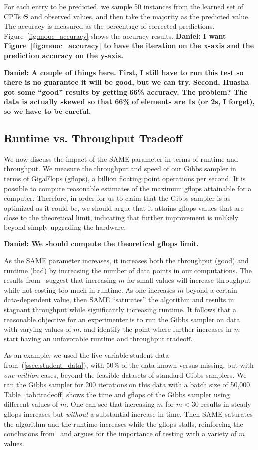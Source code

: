 \documentclass{article} %
\begin{document}
For each entry to be predicted, we sample 50 instances from the learned set of CPTs $\Theta$ and
observed values, and then take the majority as the predicted value. The accuracy is measured as the
percentage of corrected predictions.  Figure~\ref{fig:mooc_accuracy} shows the accuracy results.
\textbf{Daniel: I want Figure~\ref{fig:mooc_accuracy} to have the iteration on the x-axis and the
prediction accuracy on the y-axis.}

\textbf{Daniel: A couple of things here. First, I still have to run this test so there is no
guarantee it will be good, but we can try. Second, Huasha got some ``good'' results by getting 66\%
accuracy. The problem? The data is actually skewed so that 66\% of elements are 1s (or 2s, I
forget), so we have to be careful.}

\subsection{Runtime vs. Throughput Tradeoff}\label{ssec:tradeoff}

We now discuss the impact of the SAME parameter in terms of runtime and throughput. We measure the
throughput and speed of our Gibbs sampler in terms of GigaFlops (gflops), a billion floating point
operations per second. It is possible to compute reasonable estimates of the maximum gflops
attainable for a computer. Therefore, in order for us to claim that the Gibbs sampler is as
optimized as it could be, we should argue that it attains gflops values that are close to the
theoretical limit, indicating that further improvement is unlikely beyond simply upgrading the
hardware.

\textbf{Daniel: We should compute the theoretical gflops limit.}

As the SAME parameter increases, it increases both the throughput (good) and runtime (bad) by
increasing the number of data points in our computations. The results from~\citep{SAME2015} suggest
that increasing $m$ for small values will increase throughput while not costing too much in runtime.
As one increases $m$ beyond a certain data-dependent value, then SAME ``saturates'' the algorithm
and results in stagnant throughput while significantly increasing runtime. It follows that a
reasonable objective for an experimenter is to run the Gibbs sampler on data with varying values of
$m$, and identify the point where further increases in $m$ start having an unfavorable runtime and
throughput tradeoff.

As an example, we used the five-variable student data from~(\ref{ssec:student_data}), with 50\% of
the data known versus missing, but with \emph{one million} cases, beyond the feasible datasets of
standard Gibbs samplers. We ran the Gibbs sampler for 200 iterations on this data with a batch size
of 50,000. Table~\ref{tab:tradeoff} shows the time and gflops of the Gibbs sampler using different
values of $m$.  One can see that increasing $m$ for $m < 30$ results in steady gflops increases but
\emph{without} a substantial increase in time. Then SAME saturates the algorithm and the runtime
increases while the gflops stalls, reinforcing the conclusions from~\citep{SAME2015} and argues for
the importance of testing with a variety of $m$ values.
\end{document}
